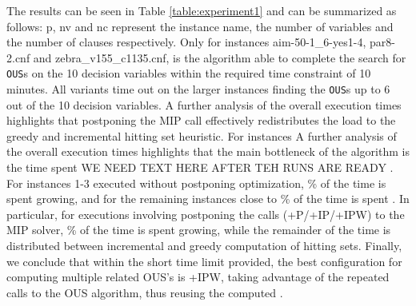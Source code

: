 The results can be seen in Table \ref{table:experiment1} and can be summarized as follows: p, nv and nc represent the instance name, the number of variables and the number of clauses respectively. 
Only for instances aim-50-1\_6-yes1-4, par8-2.cnf and zebra\_v155\_c1135.cnf, is the algorithm able to complete the search for \texttt{OUS}s on the 10 decision variables within the required time constraint of 10 minutes.
All variants time out on the larger instances finding the \texttt{OUS}s up to 6 out of the 10 decision variables. 
A further analysis of the overall execution times highlights that postponing the MIP call effectively redistributes the load to the greedy and incremental hitting set heuristic.
For instances 
A further analysis of the overall execution times highlights that the main bottleneck of the algorithm is the time spent WE NEED TEXT HERE AFTER TEH RUNS ARE READY
. For instances 1-3 executed without postponing optimization, \% of the time is spent growing, and for the remaining instances close to  \% of the time is spent  .
In particular, for executions involving postponing the calls (+P/+IP/+IPW) to the MIP solver, \% of the time is spent growing, while the remainder of the time is distributed between incremental and greedy computation of hitting sets.
Finally, we conclude that within the short time limit provided, the best configuration for computing multiple related OUS's is \omus+IPW, taking advantage of the repeated calls to the OUS algorithm, thus reusing the computed \satsets.

